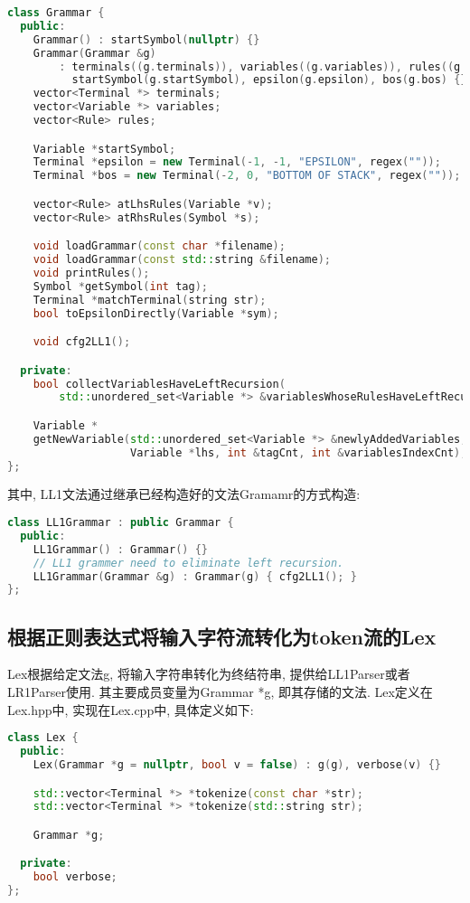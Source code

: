 \begin{lstlisting}[language=c++]
class Grammar {
  public:
    Grammar() : startSymbol(nullptr) {}
    Grammar(Grammar &g)
        : terminals((g.terminals)), variables((g.variables)), rules((g.rules)),
          startSymbol(g.startSymbol), epsilon(g.epsilon), bos(g.bos) {}
    vector<Terminal *> terminals;
    vector<Variable *> variables;
    vector<Rule> rules;

    Variable *startSymbol;
    Terminal *epsilon = new Terminal(-1, -1, "EPSILON", regex(""));
    Terminal *bos = new Terminal(-2, 0, "BOTTOM OF STACK", regex(""));

    vector<Rule> atLhsRules(Variable *v);
    vector<Rule> atRhsRules(Symbol *s);

    void loadGrammar(const char *filename);
    void loadGrammar(const std::string &filename);
    void printRules();
    Symbol *getSymbol(int tag);
    Terminal *matchTerminal(string str);
    bool toEpsilonDirectly(Variable *sym);

    void cfg2LL1();

  private:
    bool collectVariablesHaveLeftRecursion(
        std::unordered_set<Variable *> &variablesWhoseRulesHaveLeftRecursion);

    Variable *
    getNewVariable(std::unordered_set<Variable *> &newlyAddedVariables,
                   Variable *lhs, int &tagCnt, int &variablesIndexCnt);
};
\end{lstlisting}
其中, LL1文法通过继承已经构造好的文法Gramamr的方式构造:
\begin{lstlisting}[language=c++]
class LL1Grammar : public Grammar {
  public:
    LL1Grammar() : Grammar() {}
    // LL1 grammer need to eliminate left recursion.
    LL1Grammar(Grammar &g) : Grammar(g) { cfg2LL1(); }
};
\end{lstlisting}

\subsection{根据正则表达式将输入字符流转化为token流的Lex}
Lex根据给定文法g, 将输入字符串转化为终结符串, 提供给LL1Parser或者LR1Parser使用.
其主要成员变量为Grammar *g, 即其存储的文法. Lex定义在Lex.hpp中, 实现在Lex.cpp中,
具体定义如下:
\begin{lstlisting}[language=c++]
class Lex {
  public:
    Lex(Grammar *g = nullptr, bool v = false) : g(g), verbose(v) {}

    std::vector<Terminal *> *tokenize(const char *str);
    std::vector<Terminal *> *tokenize(std::string str);

    Grammar *g;

  private:
    bool verbose;
};
\end{lstlisting}

